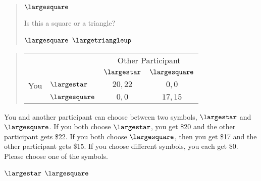 \documentclass[11pt]{article}
\begin{document}
\begin{tcolorbox}
\begin{quote}
\begin{center}
{\Huge $\largesquare$}
\end{center}
 \centering Is this a square or a triangle?

 \begin{center}
$\largesquare$ \qquad $\largetriangleup$
\end{center}
\end{quote}

\begin{quote}
\begin{center}
\begin{tabular}{llcc}
    & & \multicolumn{2}{c}{Other Participant}  \\
& & $\largestar$ & $\largesquare$  \\ \cline{3-4}
You & $\largestar$ & \multicolumn{1}{|c|}{$20,22$} & \multicolumn{1}{c|}{$0,0$}  \\ \cline{3-4}
& $\largesquare$ & \multicolumn{1}{|c|}{$0,0$} & \multicolumn{1}{c|}{$17,15$}  \\ \cline{3-4}
\end{tabular}
\end{center}
\end{quote}

You and another participant can choose between two symbols, $\largestar$ and $\largesquare$. If you both choose $\largestar$, you get \$20 and the other participant gets \$22. If you both choose $\largesquare$, then you get \$17 and the other participant gets \$15. If you choose different symbols, you each get \$0.\\

Please choose one of the symbols.\\


\begin{center}
$\largestar$ \qquad $\largesquare$
\end{center}
\end{tcolorbox}
\end{document}
